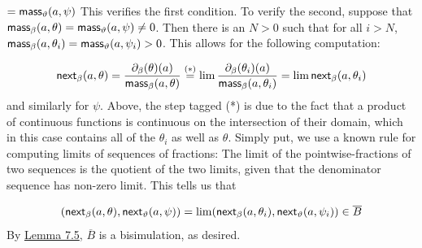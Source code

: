 \documentclass[11pt,a4paper]{amsart}
\begin{document}
\hypertarget{html:S7.Ex11}{}   %
\hypertarget{html:S7.Ex11.m1}{}\({\displaystyle=\mbox{\sf mass}_{\vartheta}(a,\psi)}\)    This verifies the first condition. To verify the second, suppose that %
\hypertarget{html:S7.SS0.SSS0.P0.SPx7.p2.m8}{}\({\mbox{\sf mass}_{\beta}(a,\theta)=\mbox{\sf mass}_{\vartheta}(a,\psi)\neq 0}\). Then there is an %
\hypertarget{html:S7.SS0.SSS0.P0.SPx7.p2.m9}{}\({N>0}\) such that for all %
\hypertarget{html:S7.SS0.SSS0.P0.SPx7.p2.m10}{}\({i>N}\), %
\hypertarget{html:S7.SS0.SSS0.P0.SPx7.p2.m11}{}\({\mbox{\sf mass}_{\beta}(a,\theta_{i})=\mbox{\sf mass}_{\vartheta}(a,\psi_{i})>0}\). This allows for the following computation:
\par\medskip
\hypertarget{html:S7.Ex12}{}   %
\hypertarget{html:S7.Ex12.m1}{}\[\mbox{\sf next}_{\beta}(a,\theta)=\frac{\partial_{\beta}(\theta)(a)}{\mbox{\sf
mass}_{\beta}(a,\theta)}\overset{(*)}{=}\lim\frac{\partial_{\beta}(\theta_{i})(a)}{\mbox{\sf mass}_{\beta}(a,\theta_{i})}=\lim\mbox{\sf next}_{\beta}(a,\theta_{i})\]    and similarly for %
\hypertarget{html:S7.SS0.SSS0.P0.SPx7.p2.m12}{}\({\psi}\). Above, the step tagged (*) is due to the fact that a product of continuous functions is continuous on the intersection of their domain, which in this case contains all of the %
\hypertarget{html:S7.SS0.SSS0.P0.SPx7.p2.m13}{}\({\theta_{i}}\) as well as %
\hypertarget{html:S7.SS0.SSS0.P0.SPx7.p2.m14}{}\({\theta}\). Simply put, we use a known rule for computing limits of sequences of fractions: The limit of the pointwise-fractions of two sequences is the quotient of the two limits, given that the denominator sequence has non-zero limit. This tells us that
\par\medskip
\hypertarget{html:S7.Ex13}{}   %
\hypertarget{html:S7.Ex13.m1}{}\[(\mbox{\sf next}_{\beta}(a,\theta),\mbox{\sf next}_{\vartheta}(a,\psi))=\lim(\mbox{\sf next}_{\beta}(a,\theta_{i}),\mbox{\sf next}_{\vartheta}(a,\psi_{i}))\in\overline{B}\]    By \hyperlink{html:S7.Thmtheorem5}{Lemma 7.5}, %
\hypertarget{html:S7.SS0.SSS0.P0.SPx7.p2.m15}{}\({\overline{B}}\) is a bisimulation, as desired. %
\end{document}
